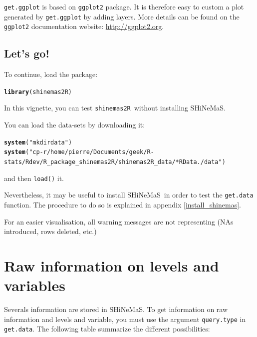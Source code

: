 \documentclass{article}\usepackage[]{graphicx}\usepackage[]{color}
\makeatletter
\newcommand{\hlstr}[1]{\textcolor[rgb]{0.192,0.494,0.8}{#1}}%
\newcommand{\hlstd}[1]{\textcolor[rgb]{0.345,0.345,0.345}{#1}}%
\newcommand{\hlkwd}[1]{\textcolor[rgb]{0.737,0.353,0.396}{\textbf{#1}}}%
\newenvironment{kframe}{%
 \def\at@end@of@kframe{}%
 \ifinner\ifhmode%
  \def\at@end@of@kframe{\end{minipage}}%
  \begin{minipage}{\columnwidth}%
 \fi\fi%
 \def\FrameCommand##1{\hskip\@totalleftmargin \hskip-\fboxsep
 \colorbox{shadecolor}{##1}\hskip-\fboxsep
     \hskip-\linewidth \hskip-\@totalleftmargin \hskip\columnwidth}%
 \MakeFramed {\advance\hsize-\width
   \@totalleftmargin\z@ \linewidth\hsize
   \@setminipage}}%
 {\par\unskip\endMakeFramed%
 \at@end@of@kframe}
\newenvironment{knitrout}{}{} %
\newcommand{\BD}{SHiNeMaS}
\newcommand{\pack}{\texttt{shinemas2R}}
\makeatother
\begin{document}
\texttt{get.ggplot} is based on \texttt{ggplot2} package.
It is therefore easy to custom a plot generated by \texttt{get.ggplot} by adding layers.
More details can be found on the \texttt{ggplot2} documentation website: \url{http://ggplot2.org}.

\subsection{Let’s go!}

To continue, load the package:
\begin{knitrout}
\color{fgcolor}\begin{kframe}
\begin{alltt}
\hlkwd{library}\hlstd{(shinemas2R)}
\end{alltt}
\end{kframe}
\end{knitrout}

In this vignette, you can test \pack~without installing \BD.

You can load the data-sets by downloading it:

\begin{knitrout}
\color{fgcolor}\begin{kframe}
\begin{alltt}
\hlkwd{system}\hlstd{(}\hlstr{"mkdir data"}\hlstd{)}
\hlkwd{system}\hlstd{(}\hlstr{"cp -r /home/pierre/Documents/geek/R-stats/Rdev/R_package_shinemas2R/shinemas2R_data/*RData ./data"}\hlstd{)}
\end{alltt}
\end{kframe}
\end{knitrout}

and then \texttt{load()} it.


Nevertheless, it may be useful to install \BD~in order to test the \texttt{get.data} function.
The procedure to do so is explained in appendix \ref{install_shinemas}.

For an easier visualisation, all warning messages are not representing (NAs introduced, rows deleted, etc.)


\newpage


\section{Raw information on levels and variables}
\label{raw}

Severals information are stored in \BD.
To get information on raw information and levels and variable, you must use the argument \texttt{query.type} in \texttt{get.data}.
The following table summarize the different possibilities:
\end{document}
